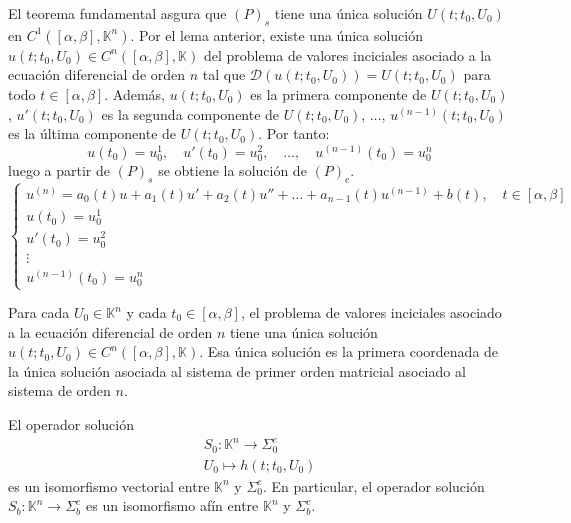     El teorema fundamental asgura que $(P)_s$ tiene una única solución $U(t; t_0, U_0)$ en $C^1([\alpha, \beta], \mathbb{K}^n)$. Por el lema anterior, existe una única solución $u(t; t_0, U_0) \in C^n([\alpha, \beta], \mathbb{K})$ del problema de valores inciciales asociado a la ecuación diferencial de orden $n$ tal que $\mathcal{D}(u(t; t_0, U_0)) = U(t; t_0, U_0)$ para todo $t \in [\alpha, \beta]$. Además, $u(t; t_0, U_0)$ es la primera componente de $U(t; t_0, U_0)$, $u'(t; t_0, U_0)$ es la segunda componente de $U(t; t_0, U_0)$, $\ldots$, $u^{(n-1)}(t; t_0, U_0)$ es la última componente de $U(t; t_0, U_0)$. Por tanto:
    \[
        u(t_0) = u_0^1, \quad u'(t_0) = u_0^2, \quad \ldots, \quad u^{(n-1)}(t_0) = u_0^n
    \]
    luego a partir de $(P)_s$ se obtiene la solución de $(P)_e$.
    \[
        \begin{cases}
            u^{(n)} = a_0(t) u + a_1(t) u' + a_2(t) u'' + \ldots + a_{n-1}(t) u^{(n-1)} + b(t), \quad t \in [\alpha, \beta] \\
            u(t_0) = u_0^1 \\
            u'(t_0) = u_0^2 \\
            \vdots \\
            u^{(n-1)}(t_0) = u_0^n
        \end{cases}
    \]

\begin{corolario}
    Para cada $U_0 \in \mathbb{K}^n$ y cada $t_0 \in [\alpha, \beta]$, el problema de valores inciciales asociado a la ecuación diferencial de orden $n$ tiene una única solución $u(t; t_0, U_0) \in C^n([\alpha, \beta], \mathbb{K})$. Esa única solución es la primera coordenada de la única solución asociada al sistema de primer orden matricial asociado al sistema de orden $n$.
\end{corolario}

\begin{teorema}
    El operador solución
    \[
        \begin{matrix}
            S_0 : \mathbb{K}^n \to \Sigma_0^e \\
            U_0 \mapsto h(t; t_0, U_0)
        \end{matrix}
    \]
    es un isomorfismo vectorial entre $\mathbb{K}^n$ y $\Sigma_0^e$. En particular, el operador solución $S_b : \mathbb{K}^n \to \Sigma_b^e$ es un isomorfismo afín entre $\mathbb{K}^n$ y $\Sigma_b^e$.
\end{teorema}


